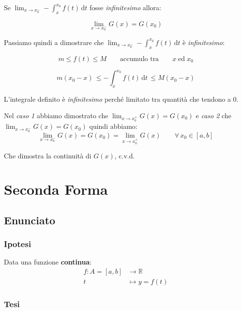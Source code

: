 \documentclass[../dimostrazioni]{subfiles}
\begin{document}
                    Se \( \lim_{x \to x_0^-} - \int_x^{x_0} \! f(t) \, \mathrm{d}t \) fosse \emph{infinitesimo} allora:

                    \[  \lim_{x \to x_0^-}G(x) = G(x_0) \]

                    Passiamo quindi a dimostrare che \( \lim_{x \to x_0^-} - \int_x^{x_0} \! f(t) \, \mathrm{d}t \) è \emph{infinitesimo}:

                    \[m \leqslant f(t) \leqslant M \qquad \text {accumulo tra} \qquad x \; \text{ed} \; x_0 \]

                    \[m(x_0-x) \, \leqslant - \int_x^{x_0} \! f(t) \, \mathrm{d}t \, \leqslant M(x_0-x) \]

                    L'integrale definito è \emph{infinitesimo} perché limitato tra quantità che tendono a 0.

                Nel \emph{caso 1} abbiamo dimostrato che \(  \lim_{x \to x_0^+}G(x) = G(x_0) \) e \emph{caso 2} che \(  \lim_{x \to x_0^-}G(x) = G(x_0) \) quindi abbiamo:
                \[  \lim_{x \to x_0^-}G(x) = G(x_0) = \lim_{x \to x_0^+}G(x) \qquad \forall \, x_0 \in [a, b] \]

                Che dimostra la continuità di \(G(x)\), c.v.d.
            
            \section*{Seconda Forma}

                \subsection*{Enunciato}

                    \subsubsection*{Ipotesi}

                        Data una funzione \textbf{continua}:
                        \begin{align*}
                            f : A = [a, b] &\longrightarrow \mathbb{R}\\
                            t &\longmapsto y = f(t) 
                        \end{align*}

                    \subsubsection*{Tesi}
                    
\end{document}
